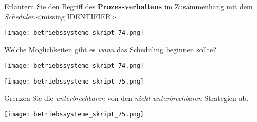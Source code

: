 \documentclass{article}
\begin{document}
\begin{tcolorbox}[colback=white!10!white,colframe=lightgray!75!black,
  savelowerto=\jobname_ex.tex,breakable,enhanced,lines before break=40]

\justifying
Erläutern Sie den Begriff des \textbf{Prozessverhaltens} im Zusammenhang mit dem \textit{Scheduler}.<missing IDENTIFIER>

\tcblower

\justifying
\begin{center}
\texttt{[image: betriebssysteme\_skript\_74.png]}
\end{center}

\end{tcolorbox}
\begin{tcolorbox}[colback=white!10!white,colframe=lightgray!75!black,
  savelowerto=\jobname_ex.tex,breakable,enhanced,lines before break=40]

\justifying
Welche Möglichkeiten gibt es \textit{wann} das Scheduling beginnen sollte?

\tcblower

\justifying
\begin{center}
\texttt{[image: betriebssysteme\_skript\_74.png]}
\end{center}
\begin{center}
\texttt{[image: betriebssysteme\_skript\_75.png]}
\end{center}

\end{tcolorbox}
\begin{tcolorbox}[colback=white!10!white,colframe=lightgray!75!black,
  savelowerto=\jobname_ex.tex,breakable,enhanced,lines before break=40]

\justifying
Grenzen Sie die \textit{unterbrechbaren} von den \textit{nicht-unterbrechbaren} Strategien ab.

\tcblower

\justifying
\begin{center}
\texttt{[image: betriebssysteme\_skript\_75.png]}
\end{center}

\end{tcolorbox}
\end{document}
